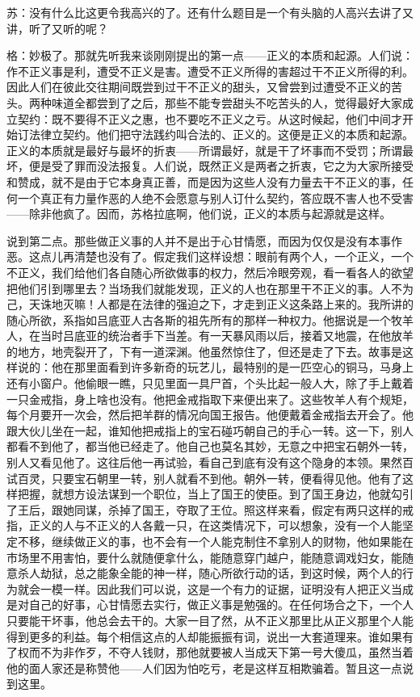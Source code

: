 \documentclass[11pt,oneside]{book}
\begin{document}
\begin{common-format}
苏：没有什么比这更令我高兴的了。还有什么题目是一个有头脑的人高兴去讲了又讲，听了又听的呢？

格：妙极了。那就先听我来谈刚刚提出的第一点——正义的本质和起源。人们说：作不正义事是利，遭受不正义是害。遭受不正义所得的害超过干不正义所得的利。因此人们在彼此交往期间既尝到过干不正义的甜头，又曾尝到过遭受不正义的苦头。两种味道全都尝到了之后，那些不能专尝甜头不吃苦头的人，觉得最好大家成立契约：既不要得不正义之惠，也不要吃不正义之亏。从这时候起，他们中间才开始订法律立契约。他们把守法践约叫合法的、正义的。这便是正义的本质和起源。正义的本质就是最好与最坏的折衷——所谓最好，就是干了坏事而不受罚；所谓最坏，便是受了罪而没法报复。人们说，既然正义是两者之折衷，它之为大家所接受和赞成，就不是由于它本身真正善，而是因为这些人没有力量去干不正义的事，任何一个真正有力量作恶的人绝不会愿意与别人订什么契约，答应既不害人也不受害——除非他疯了。因而，苏格拉底啊，他们说，正义的本质与起源就是这样。

说到第二点。那些做正义事的人并不是出于心甘情愿，而因为仅仅是没有本事作恶。这点儿再清楚也没有了。假定我们这样设想：眼前有两个人，一个正义，一个不正义，我们给他们各自随心所欲做事的权力，然后冷眼旁观，看一看各人的欲望把他们引到哪里去？当场我们就能发现，正义的人也在那里干不正义的事。人不为己，天诛地灭嘛！人都是在法律的强迫之下，才走到正义这条路上来的。我所讲的随心所欲，系指如吕底亚人古各斯的祖先所有的那样一种权力。他据说是一个牧羊人，在当时吕底亚的统治者手下当差。有一天暴风雨以后，接着又地震，在他放羊的地方，地壳裂开了，下有一道深渊。他虽然惊住了，但还是走了下去。故事是这样说的：他在那里面看到许多新奇的玩艺儿，最特别的是一匹空心的铜马，马身上还有小窗户。他偷眼一瞧，只见里面一具尸首，个头比起一般人大，除了手上戴着一只金戒指，身上啥也没有。他把金戒指取下来便出来了。这些牧羊人有个规矩，每个月要开一次会，然后把羊群的情况向国王报告。他便戴着金戒指去开会了。他跟大伙儿坐在一起，谁知他把戒指上的宝石碰巧朝自己的手心一转。这一下，别人都看不到他了，都当他已经走了。他自己也莫名其妙，无意之中把宝石朝外一转，别人又看见他了。这往后他一再试验，看自己到底有没有这个隐身的本领。果然百试百灵，只要宝石朝里一转，别人就看不到他。朝外一转，便看得见他。他有了这样把握，就想方设法谋到一个职位，当上了国王的使臣。到了国王身边，他就勾引了王后，跟她同谋，杀掉了国王，夺取了王位。照这样来看，假定有两只这样的戒指，正义的人与不正义的人各戴一只，在这类情况下，可以想象，没有一个人能坚定不移，继续做正义的事，也不会有一个人能克制住不拿别人的财物，他如果能在市场里不用害怕，要什么就随便拿什么，能随意穿门越户，能随意调戏妇女，能随意杀人劫狱，总之能象全能的神一样，随心所欲行动的话，到这时候，两个人的行为就会一模一样。因此我们可以说，这是一个有力的证据，证明没有人把正义当成是对自己的好事，心甘情愿去实行，做正义事是勉强的。在任何场合之下，一个人只要能干坏事，他总会去干的。大家一目了然，从不正义那里比从正义那里个人能得到更多的利益。每个相信这点的人却能振振有词，说出一大套道理来。谁如果有了权而不为非作歹，不夺人钱财，那他就要被人当成天下第一号大傻瓜，虽然当着他的面人家还是称赞他——人们因为怕吃亏，老是这样互相欺骗着。暂且这一点说到这里。


\end{common-format}
\end{document}
